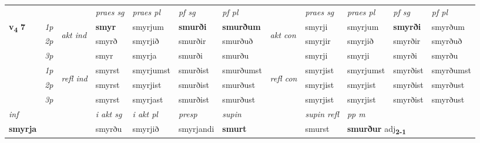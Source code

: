 \begin{longtable}[l]{X>{\footnotesize\itshape}llXXXXlXXXX}
 & &   & \textit{praes sg}  & \textit{praes pl}    & \textit{ pf sg} & \textit{pf pl} & & \textit{praes sg}  & \textit{praes pl}    & \textit{pf sg} & \textit{pf pl }  \\ \cmidrule{4-7} \cmidrule{9-12}
 \multirow{2}{*}{{{\textbf{v{\textsubscript{4}}} \Large{\textbf{7}}}}}  & 1p & \multirow{3}{*}{\begin{turn}{90}\textit{akt ind}\end{turn}} & \textbf{smyr} & smyrjum & \textbf{smurði} & \textbf{smurðum} & \multirow{3}{*}{\begin{turn}{90}\textit{akt con}\end{turn}} &smyrji & smyrjum & \textbf{smyrði} & smyrðum\\*
 & 2p &  &  smyrð  & smyrjið & smurðir & smurðuð & & smyrjir & smyrjið & smyrðir & smyrðuð \\*
 & 3p &  & smyr & smyrja & smurði & smurðu & & smyrji & smyrji& smyrði & smyrðu \\*
\cmidrule{4-7} \cmidrule{9-12}
 & 1p & \multirow{3}{*}{\begin{turn}{90}\textit{refl ind}\end{turn}}  & smyrst & smyrjumst & smurðist & smurðumst & \multirow{3}{*}{\begin{turn}{90}\textit{refl con}\end{turn}}  &smyrjist & smyrjumst & smyrðist & smyrðumst \\*
 & 2p &  & smyrst & smyrjist & smurðist & smurðust & &smyrjist & smyrjist & smyrðist & smyrðust \\*
 & 3p  & & smyrst & smyrjast & smurðist & smurðust & & smyrjist & smyrjist& smyrðist & smyrðust \\*
\cmidrule{4-7} \cmidrule{9-12}

   {\textit{inf}} & &  & \textit{i akt sg} & \textit{i akt pl}   & \textit{presp} & \textit{supin} && \textit{supin refl} & \textit{pp m} \\*
  {\textbf{smyrja}} & && smyrðu  & smyrjið   & smyrjandi &  \textbf{smurt} && smurst & \multicolumn{2}{l}{\textbf{smurður} adj\textbf{\textsubscript{2-1}}} \\*

\midrule


\end{longtable}
